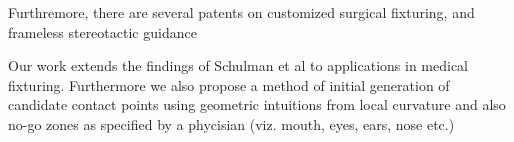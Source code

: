 Furthremore, there are several patents on customized surgical fixturing, \cite{franklin2001customized} and frameless stereotactic guidance \cite{bova2010frameless}

Our work extends the findings of Schulman et al\cite{schulman2011grasping}
to applications in medical fixturing. Furthermore we also propose a method of 
initial generation of candidate contact points using geometric intuitions from 
local curvature and also no-go zones as specified by a phycisian (viz. mouth, eyes, ears, nose etc.) 



